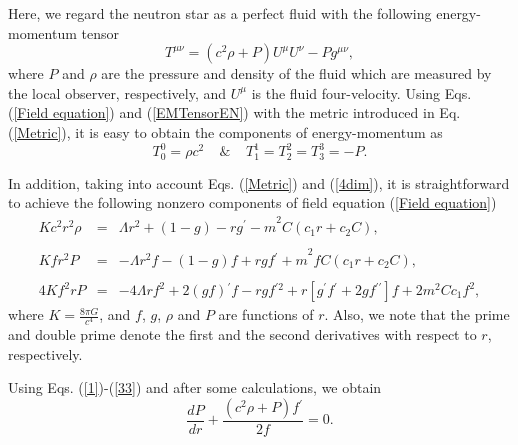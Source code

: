 \documentclass[aps]{revtex4}
\begin{document}
Here, we regard the neutron star as a perfect fluid with the following
energy-momentum tensor
\begin{equation}
T^{\mu \nu }=\left( c^{2}\rho +P\right) U^{\mu }U^{\nu }-Pg^{\mu \nu },
\label{EMTensorEN}
\end{equation}
where $P$ and $\rho $ are the pressure and density of the fluid which are
measured by the local observer, respectively, and $U^{\mu }$ is the fluid
four-velocity. Using Eqs. (\ref{Field equation}) and (\ref{EMTensorEN}) with
the metric introduced in Eq. (\ref{Metric}), it is easy to obtain the
components of energy-momentum as
\begin{equation}
T_{0}^{0}=\rho c^{2}~\ \ \ \ \&~\ \ \ \ T_{1}^{1}=T_{2}^{2}=T_{3}^{3}=-P.
\label{4dim}
\end{equation}

In addition, taking into account Eqs. (\ref{Metric}) and (\ref{4dim}), it is
straightforward to achieve the following nonzero components of field
equation (\ref{Field equation})
\begin{eqnarray}
Kc^{2}r^{2}\rho &=&\Lambda r^{2}+\left( 1-g\right) -r g{^{\prime }-m}%
^{2}C\left( c_{1}r+c_{2}C\right) ,  \label{1} \\
&&  \nonumber \\
Kfr^{2}P &=&-\Lambda r^{2}f-\left( 1-g\right) f+rg{f{^{\prime }}+m}%
^{2}fC\left( c_{1}r+c_{2}C\right) {,}  \label{2} \\
&&  \nonumber \\
4Kf^{2}r P &=&-4\Lambda rf^{2}+2\left( gf\right) {^{\prime }}f-r g f{^{\prime 2}%
}+r\left[ g{^{\prime }}f{^{\prime }+2g}f{^{\prime \prime }}\right]
f+2m^{2}Cc_{1}f^{2},  \label{33}
\end{eqnarray}%
where $K=\frac{8\pi G}{c^{4}}$, and $f$, $g$, $\rho $ and $P$ are functions
of $r$. Also, we note that the prime and double prime denote the first and
the second derivatives with respect to $r$, respectively.

Using Eqs. (\ref{1})-(\ref{33}) and after some calculations, we obtain
\begin{equation}
\frac{dP}{dr}+\frac{\left( c^{2}\rho +P\right) f{^{\prime }}}{2f}=0.
\label{extraEQ}
\end{equation}
\end{document}
